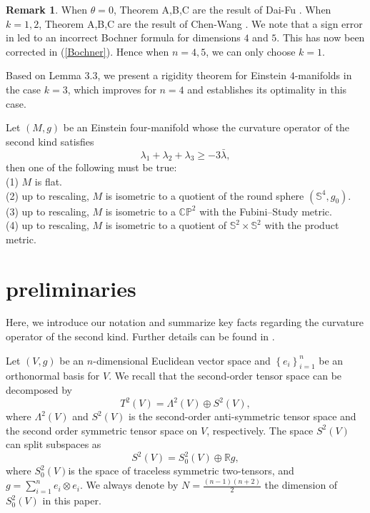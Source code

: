 \documentclass[11pt, reqno]{amsart}
\numberwithin{equation}{section}
\theoremstyle{definition}
\newtheorem{remark}[thm]{Remark}
\begin{document}
	\begin{remark}
		When $\theta=0$, Theorem A,B,C are the result of  Dai-Fu \cite{DF}. When $k=1,2$, Theorem A,B,C are the result of Chen-Wang \cite{CW1,CW}. We note that a sign error in \cite[(4.9)]{DF} led to an incorrect Bochner formula for dimensions $4$ and $5$. This has now been corrected in (\ref{Bochner}).
 Hence when $n=4,5$, we can only choose $k=1$.
	\end{remark}
	Based on Lemma $3.3$, we present a rigidity theorem for Einstein $4$-manifolds in the case $k=3$, which improves  \cite[Theorem 1.8]{Li5} for $n=4$ and establishes its optimality in this case.
	\begin{maintheorem}\label{thm:main-theorem-4}
		Let $(M,g)$ be an Einstein four-manifold whose the curvature operator of the second kind satisfies 
		\begin{equation}\label{cone}
			\lambda_{1}+\lambda_{2}+\lambda_{3}\ge -3\bar{\lambda},
		\end{equation}
		then  one of the following must be true:\\
		(1) $M$ is flat.\\
		(2)  up to rescaling, $M$ is isometric to a quotient of the round sphere $(\mathbb{S}^4, g_0)$.\\
		(3)  up to rescaling, $M$ is isometric to a $\mathbb{CP}^2$ with the Fubini–Study metric.\\
		(4)  up to rescaling, $M$ is isometric to a quotient of $\mathbb{S}^2\times \mathbb{S}^2$ with the product metric.
	\end{maintheorem}
	\section{preliminaries}
	Here, we introduce our notation and summarize key facts regarding the curvature operator of the second kind. Further details can be found in \cite{Li4,Li5,NP,DF,CW}.
	
	Let $(V,g)$ be an $n$-dimensional Euclidean vector space and $\left\{ e_i \right\}_{i=1}^{n}$ be an orthonormal basis for $V$. We recall that the second-order tensor space can be decomposed by 
	\[T^2(V)={\Lambda }^2(V)\oplus S^2(V),\]
	where ${\Lambda}^2(V)$ and $S^2(V)$ is the second-order anti-symmetric tensor space and the second order symmetric tensor space on $V$, respectively. The space $S^2(V)$ can split subspaces as
	\[S^2(V)=S_{0}^2(V)\oplus \mathbb{R}g,\]
	where $S_{0}^{2}(V)$is the space of traceless symmetric two-tensors, and $g=\sum\limits_{i=1}^{n}{e_i\otimes e_i}$. We always denote by $N=\frac{(n-1)(n+2)}{2}$ the dimension of $S_{0}^{2}(V)$ in this paper.
	
\end{document}
